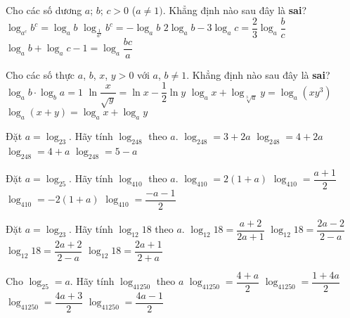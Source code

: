 \begin{ex}%
	Cho các số dương $a$; $b$; $c>0$ ($a\neq 1)$. Khẳng định nào sau đây là \textbf{sai}?
	\choice
	{$\log_{a^c}b^c=\log_ab$}
	{$\log_{\tfrac{1}{a^c}}b^c=-\log_ab$}
	{\True $2\log_ab-3\log_ac=\dfrac{2}{3}\log_a\dfrac{b}{c}$}
	{$\log_ab+\log_ac-1=\log_a\dfrac{bc}{a}$}
\end{ex}

\begin{ex}%
	Cho các số thực $a$, $b$, $x$, $y>0$ với $a$, $b\neq 1$. Khẳng định nào sau đây là \textbf{sai}? 
	\choice
	{$\log_ab\cdot\log_ba=1$}
	{$\ln \dfrac{x}{\sqrt{y}}=\ln x-\dfrac{1}{2}\ln y$}
	{$\log_ax+\log_{\sqrt[3]{a}}y=\log_a\left(xy^3\right)$}
	{\True $\log_a(x+y)=\log_ax+\log_ay$}
\end{ex}

\begin{ex}%
	Đặt $a=\log_23$. Hãy tính $\log_248$ theo $a$.
	\choice
	{$\log_248=3+2a$}
	{$\log_248=4+2a$}
	{\True $\log_248=4+a$}
	{$\log_248=5-a$}
\end{ex}

\begin{ex}%
	Đặt $a=\log_25$. Hãy tính $\log_410$ theo $a$.
	\choice
	{$\log_410=2(1+a)$}
	{\True $\log_410=\dfrac{a+1}{2}$}
	{$\log_410=-2(1+a)$}
	{$\log_410=\dfrac{-a-1}{2}$}
\end{ex}

\begin{ex}%
	Đặt $a=\log_23$. Hãy tính $\log_{12}18$ theo $a$.
	\choice
	{$\log_{12}18=\dfrac{a+2}{2a+1}$}
	{$\log_{12}18=\dfrac{2a-2}{2-a}$}
	{$\log_{12}18=\dfrac{2a+2}{2-a}$}
	{\True $\log_{12}18=\dfrac{2a+1}{2+a}$}
\end{ex}

\begin{ex}%
	Cho $\log_25=a$. Hãy tính $\log_41250$ theo $a$
	\choice
	{$\log_41250=\dfrac{4+a}{2}$}
	{\True $\log_41250=\dfrac{1+4a}{2}$}
	{$\log_41250=\dfrac{4a+3}{2}$}
	{$\log_41250=\dfrac{4a-1}{2}$}
\end{ex}

